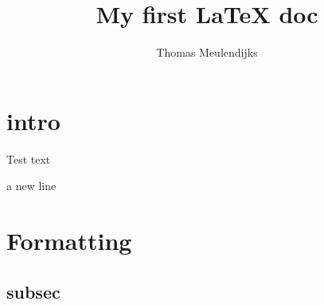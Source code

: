 \documentclass{article}
\author{Thomas Meulendijks}
\title{My first {\LaTeX} doc}
\begin{document}
\maketitle

\section{intro}

Test text

a new line

\section{Formatting}

\subsection{subsec}
\end{document}
